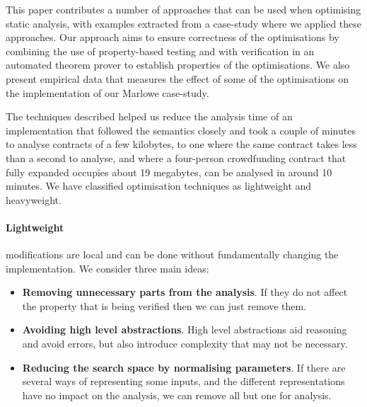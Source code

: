 \documentclass[english,runningheads]{llncs}
\begin{document}


This paper contributes a number of approaches that can be used when
optimising static analysis, with examples extracted from a case-study where
we applied these approaches. Our approach aims to ensure correctness
of the optimisations by combining the use of property-based testing
and with verification in an automated theorem prover to establish properties of the optimisations. We also present empirical data
that measures the effect of some of the optimisations on the implementation
of our Marlowe case-study.

The techniques described helped us reduce the analysis time of an implementation
that followed the semantics closely and took a couple of minutes to analyse contracts
of a few kilobytes, to one where the same contract takes less
than a second to analyse, and where a four-person crowdfunding contract that
fully expanded occupies about 19 megabytes, can be analysed in
around 10 minutes. 
We have classified optimisation techniques as lightweight and heavyweight. 

\paragraph*{Lightweight}

modifications are local and can be done without fundamentally changing
the implementation. We consider three main ideas:
\begin{itemize}
\item \textbf{Removing unnecessary parts from the analysis}. If they do not affect
the property that is being verified then we can just remove them.
\item \textbf{Avoiding high level abstractions}. High level abstractions aid reasoning
and avoid errors, but also introduce complexity that may not be necessary.
\item \textbf{Reducing the search space by normalising parameters}. If there are several
ways of representing some inputs, and the different representations
have no impact on the analysis, we can remove all but one for analysis.
\end{itemize}
\end{document}

